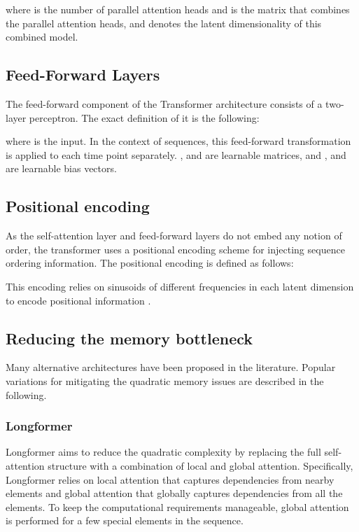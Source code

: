 \documentclass[lettersize,journal]{IEEEtran}
\begin{document}
where  is the number of parallel attention heads and  is the matrix that combines the parallel attention heads, and  denotes the latent dimensionality of this combined model.




\subsection{Feed-Forward Layers}
The feed-forward component of the Transformer architecture consists of a two-layer perceptron. The exact definition of it is the following:

where  is the input. In the context of sequences, this feed-forward transformation is applied to each time point separately. , and  are learnable matrices, and , and  are learnable bias vectors.  


\subsection{Positional encoding}
As the self-attention layer and feed-forward layers do not embed any notion of order, the transformer uses a positional encoding scheme for injecting sequence ordering information. The positional encoding is defined as follows:


This encoding relies on sinusoids of different frequencies in each latent dimension to encode positional information \cite{vaswani2017}. 







\subsection{Reducing the memory bottleneck}
\label{sec:efficient-self-attention}
Many alternative architectures have been proposed in the literature. Popular variations for mitigating the quadratic memory issues are described in the following.


\subsubsection{Longformer} 

Longformer \cite{beltagy2020longformer} aims to reduce the quadratic complexity by replacing the full self-attention structure with a combination of local and global attention. 
Specifically, Longformer relies on local attention that captures dependencies from nearby elements and global attention that globally captures dependencies from all the elements. To keep the computational requirements manageable, global attention is performed for a few special elements in the sequence.
\end{document}
